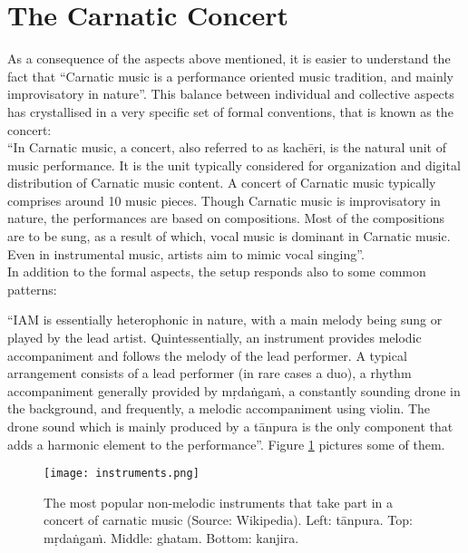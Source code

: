 \section{The Carnatic Concert}

As a consequence of the aspects above mentioned, it is easier to understand the fact that ``Carnatic music is a performance oriented music tradition, and mainly improvisatory in nature''\cite[p.16]{gulati}. This balance between individual and collective aspects has crystallised in a very specific set of formal conventions, that is known as the concert:\\

``In Carnatic music, a concert, also referred to as kach\=eri, is the natural unit of music performance. It is the unit typically considered for organization and digital distribution of Carnatic music content. A concert of Carnatic music typically comprises around 10 music pieces. Though Carnatic music is improvisatory in nature, the performances are based on compositions. Most of the compositions are to be sung, as a result of which, vocal music is dominant in Carnatic music. Even in instrumental music, artists aim to mimic vocal singing''\cite[p.16]{gulati}.\\

In addition to the formal aspects, the setup responds also to some common patterns:

``IAM is essentially heterophonic in nature, with a main melody being sung or played by the lead artist. Quintessentially, an instrument provides melodic accompaniment and follows the melody of the lead performer. A typical arrangement consists of a lead performer (in rare cases a duo), a rhythm accompaniment generally provided by  m\d{r}da\.{n}ga\.{m}, a constantly sounding drone in the background, and frequently, a melodic accompaniment using violin. The drone sound which is mainly produced by a t\=anpura is the only component that adds a harmonic element to the performance''\cite[p.16]{gulati}. Figure \ref{fig:instruments} pictures some of them.\\

\begin{figure}[h]
  \centering
  \texttt{[image: instruments.png]}
  \caption{The most popular non-melodic instruments that take part in a concert of carnatic music (Source: Wikipedia). Left: t\=anpura. Top: m\d{r}da\.{n}ga\.{m}. Middle: ghatam. Bottom: kanjira.}
  \label{fig:instruments}
\end{figure}



